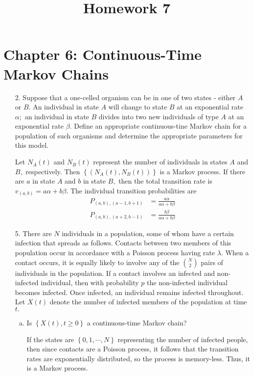 \documentclass{article}
\begin{document}
\title{Homework 7}
\maketitle
\thispagestyle{fancy}

\section*{Chapter 6: Continuous-Time Markov Chains}

\begin{itemize}
	\item[2.] Suppose that a one-celled organism can be in one of two states - either $A$ or $B.$ An individual in state $A$ will change to state $B$ at an exponential rate $\alpha;$ an individual in state $B$ divides into two new individuals of type $A$ at an exponential rate $\beta.$ Define an appropriate continuous-tine Markov chain for a population of such organisms and determine the appropriate parameters for this model.
		\begin{soln}
			Let $N_A(t)$ and $N_B(t)$ represent the number of individuals in states $A$ and $B,$ respectively. Then $\left\{ (N_A(t), N_B(t)) \right\}$ is a Markov process. If there are $a$ in state $A$ and $b$ in state $B,$ then the total transition rate is $v_{(a, b)}=a\alpha + b\beta.$ The individual transition probabilities are
			\begin{align*}
				P_{(a, b), (a-1, b+1)} &= \frac{a\alpha}{a\alpha+b\beta} \\
				P_{(a, b), (a+2, b-1)} &= \frac{b\beta}{a\alpha+b\beta}
			\end{align*}
		\end{soln}

	\item[5.] There are $N$ individuals in a population, some of whom have a certain infection that spreads as follows. Contacts between two members of this population occur in accordance with a Poisson process having rate $\lambda.$ When a contact occurs, it is equally likely to involve any of the $\binom{N}{2}$ pairs of individuals in the population. If a contact involves an infected and non-infected individual, then with probability  $p$ the non-infected individual becomes infected. Once infected, an individual remains infected throughout. Let $X(t)$ denote the number of infected members of the population at time $t.$
		\begin{enumerate}[(a)]
			\item Is $\left\{ X(t), t\ge0 \right\}$ a continuous-time Markov chain?
				\begin{answer*}
					If the states are $\left\{ 0, 1, \cdots, N \right\}$ representing the number of infected people, then since contacts are a Poisson process, it follows that the transition rates are exponentially distributed, so the process is memory-less. Thus, it is a Markov process.
				\end{answer*}


\end{enumerate}
\end{itemize}
\end{document}
